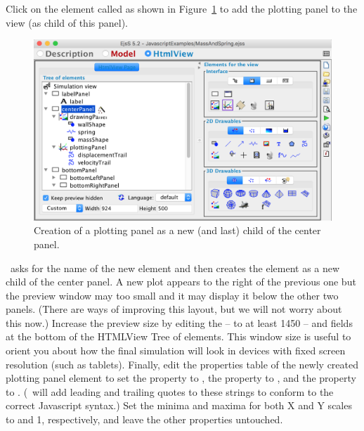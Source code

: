 Click on the  element  called  as shown in
Figure~\ref{fig:03ExplorationJavascript/ModifyViewAddPlottingPanel} to add the plotting panel to the view (as child of this panel).

\begin{figure}[htb]
    \centering
  \includegraphics[scale=\scale]{03ExplorationJavascript/images/ModifyViewAddPlottingPanel.png}
    \caption{Creation of a plotting panel as a new (and last) child of the center panel.}
    \label{fig:03ExplorationJavascript/ModifyViewAddPlottingPanel}
\end{figure}

\ejs\ asks for the name of the new element and then creates the element as a new child of the center panel. A new plot appears to the right of the previous one but the preview window may too small and it may display it below the other two panels. (There are ways of improving this layout, but we will not worry about this now.)
 Increase the preview size by editing the  -- to at least 1450 -- and  fields at the bottom of the HTMLView Tree of elements. This window size is useful to orient you about how the final simulation will look in devices with fixed screen resolution (such as tablets). Finally, edit the
properties table of the newly created plotting panel element to set the  property to ,
the  property to , and the  property to . (\ejs\ will
add leading and trailing quotes to these strings to conform to the correct Javascript syntax.) Set the minima
and maxima for both X and Y scales to  and {1}, respectively, and leave the other properties untouched.

